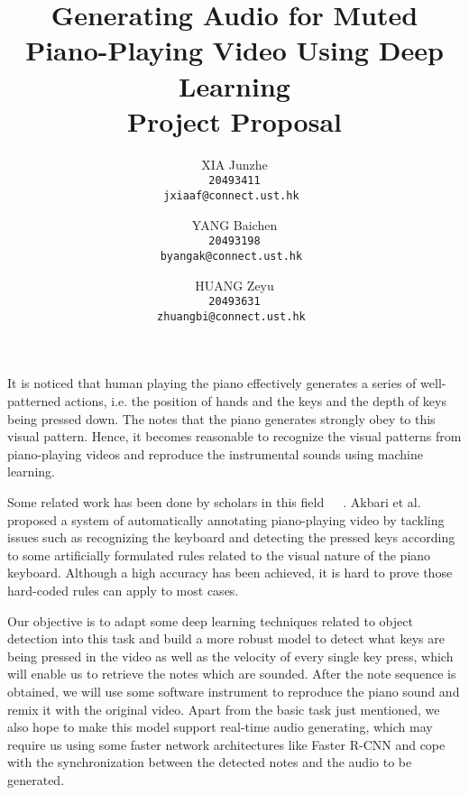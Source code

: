\documentclass[10pt,letterpaper]{article}
\begin{document}
\title{Generating Audio for Muted Piano-Playing Video 
Using Deep Learning\linebreak\\\textbf{Project Proposal}}

\author{XIA Junzhe\\
\tt\small 20493411\\
{\tt\small jxiaaf@connect.ust.hk}
\and
YANG Baichen\\
\tt\small 20493198\\
{\tt\small byangak@connect.ust.hk}
\and
HUANG Zeyu\\
\tt\small 20493631\\
{\tt\small zhuangbi@connect.ust.hk}
}

\maketitle
It is noticed that human playing the piano effectively generates a series of well-patterned actions, i.e. the position of hands and the keys and the depth of keys being pressed down. The notes that the piano generates strongly obey to this visual pattern. Hence, it becomes reasonable to recognize the visual patterns from piano-playing videos and reproduce the instrumental sounds using machine learning.

Some related work has been done by scholars in this field~\cite{A}~\cite{B}~\cite{C}. Akbari et al.~\cite{D} proposed a system of automatically annotating piano-playing video by tackling issues such as recognizing the keyboard and detecting the pressed keys according to some artificially formulated rules related to the visual nature of the piano keyboard. Although a high accuracy has been achieved, it is hard to prove those hard-coded rules can apply to most cases.

Our objective is to adapt some deep learning techniques related to object detection into this task and build a more robust model to detect what keys are being pressed in the video as well as the velocity of every single key press, which will enable us to retrieve the notes which are sounded. After the note sequence is obtained, we will use some software instrument to reproduce the piano sound and remix it with the original video. Apart from the basic task just mentioned, we also hope to make this model support real-time audio generating, which may require us using some faster network architectures like Faster R-CNN and cope with the synchronization between the detected notes and the audio to be generated.
\end{document}
